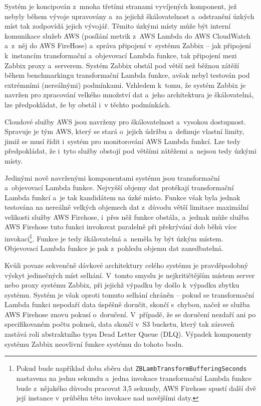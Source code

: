 \documentclass[czech, ing, kiv, he, iso690]{fasthesis}
\begin{document}
Systém je koncipován z~mnoha třetími stranami vyvíjených komponent, jež nebyly během vývoje upravovány a~za jejichž škálovatelnost a~odstranění úzkých míst tak zodpovídá jejich vývojář. Těmito úzkými místy může být interní komunikace služeb AWS (posílání metrik z~AWS Lambda do AWS CloudWatch a~z~něj do AWS FireHose) a~správa připojení v~systému Zabbix -- jak připojení k~instancím transformační a~objevovací Lambda funkce, tak připojení mezi Zabbix proxy a~serverem. Systém Zabbix obstál pod větší než běžnou zátěží během benchmarkingu transformační Lambda funkce, avšak nebyl testován pod extrémními (nereálnými) podmínkami. Vzhledem k~tomu, že systém Zabbix je navržen pro zpracování velkého množství dat a~jeho architektura je škálovatelná, lze předpokládat, že by obstál i~v těchto podmínkách.

Cloudové služby AWS jsou navrženy pro škálovatelnost a~vysokou dostupnost. Spravuje je tým AWS, který se stará o~jejich údržbu a~definuje vlastní limity, jimiž se musí řídit i~systém pro monitorování AWS Lambda funkcí. Lze tedy předpokládat, že i~tyto služby obstojí pod většími zátěžemi a~nejsou tedy úzkými místy.

Jedinými nově navrženými komponentami systému jsou transformační a~objevovací Lambda funkce. Nejvyšší objemy dat protékají transformační Lambda funkcí a~je tak kandidátem na úzké místo. Funkce však byla jednak testována na nereálně velkých objemech dat z~důvodu větší limitace maximální velikosti služby AWS Firehose, i~přes něž funkce obstála, a~jednak může služba AWS Firehose tuto funkci invokovat paralelně při překrývání dob běhů více invokací\footnote{Pokud bude například doba sběru dat \texttt{ZBLambTransformBufferingSeconds} nastavena na jednu sekundu a~jedna invokace transformační Lambda funkce bude z~nějakého důvodu pracovat 3,5 sekundy, AWS Firehose spustí další dvě její instance v~průběhu této invokace nad novějšími daty.}. Funkce je tedy škálovatelná a~neměla by být úzkým místem. Objevovací Lambda funkce je pak z~pohledu objemu dat zanedbatelná.

Kvůli povaze sekvenčně dávkové architektury celého systému je pravděpodobný výskyt jedinečných míst selhání. V~tomto smyslu je nejkritičtějším místem server nebo proxy systému Zabbix, při jejichž výpadku by došlo k~výpadku zbytku systému. Systém je však oproti tomuto selhání chráněn -- pokud se transformační Lambda funkci nepodaří data úspěšně doručit, skončí s~chybou, načež se služba AWS Firehose znovu pokusí o~doručení. V~případě, že se doručení nezdaří ani po specifikovaném počtu pokusů, data skončí v~S3 bucketu, který tak zároveň zastává roli abstraktního typu Dead Letter Queue (DLQ). Výpadek komponenty systému Zabbix neovlivní funkce systému do tohoto bodu.
\end{document}
